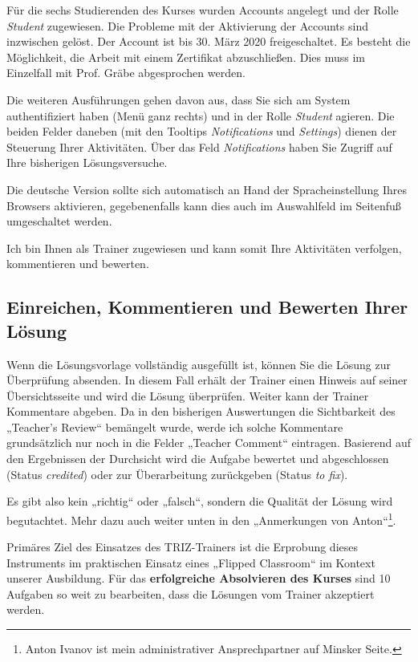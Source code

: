 \documentclass[11pt,a4paper]{article}
\begin{document}
Für die sechs Studierenden des Kurses wurden Accounts angelegt und der Rolle
\emph{Student} zugewiesen.  Die Probleme mit der Aktivierung der Accounts sind
inzwischen gelöst. Der Account ist bis 30. März 2020 freigeschaltet.  Es
besteht die Möglichkeit, die Arbeit mit einem Zertifikat abzuschließen. Dies
muss im Einzelfall mit Prof. Gräbe abgesprochen werden.

Die weiteren Ausführungen gehen davon aus, dass Sie sich am System
authentifiziert haben (Menü ganz rechts) und in der Rolle \emph{Student}
agieren.  Die beiden Felder daneben (mit den Tooltips \emph{Notifications} und
\emph{Settings}) dienen der Steuerung Ihrer Aktivitäten. Über das Feld
\emph{Notifications} haben Sie Zugriff auf Ihre bisherigen Lösungsversuche.

Die deutsche Version sollte sich automatisch an Hand der Spracheinstellung
Ihres Browsers aktivieren, gegebenenfalls kann dies auch im Auswahlfeld im
Seitenfuß umgeschaltet werden.  

Ich bin Ihnen als Trainer zugewiesen und kann somit Ihre Aktivitäten
verfolgen, kommentieren und bewerten.

\subsection{Einreichen, Kommentieren und Bewerten Ihrer Lösung}

Wenn die Lösungsvorlage vollständig ausgefüllt ist, können Sie die Lösung zur
Überprüfung absenden. In diesem Fall erhält der Trainer einen Hinweis auf
seiner Übersichtsseite und wird die Lösung überprüfen.  Weiter kann der
Trainer Kommentare abgeben. Da in den bisherigen Auswertungen die Sichtbarkeit
des „Teacher's Review“ bemängelt wurde, werde ich solche Kommentare
grundsätzlich nur noch in die Felder „Teacher Comment“ eintragen.  Basierend
auf den Ergebnissen der Durchsicht wird die Aufgabe bewertet und abgeschlossen
(Status \emph{credited}) oder zur Überarbeitung zurückgeben (Status \emph{to
  fix}).

Es gibt also kein „richtig“ oder „falsch“, sondern die Qualität der Lösung
wird begutachtet. Mehr dazu auch weiter unten in den „Anmerkungen von
Anton“\footnote{Anton Ivanov ist mein administrativer Ansprechpartner auf
  Minsker Seite.}.

Primäres Ziel des Einsatzes des TRIZ-Trainers ist die Erprobung dieses
Instruments im praktischen Einsatz eines „Flipped Classroom“ im Kontext
unserer Ausbildung.  Für das \textbf{erfolgreiche Absolvieren des Kurses} sind
10 Aufgaben so weit zu bearbeiten, dass die Lösungen vom Trainer akzeptiert
werden. 
\end{document}
